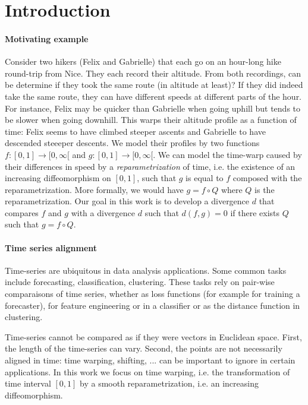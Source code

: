\section{Introduction}
\paragraph{Motivating example} Consider two hikers (Felix and Gabrielle) that each go on an hour-long hike round-trip from Nice. They each record their altitude. From both recordings, can be determine if they took the same route (in altitude at least)? If they did indeed take the same route, they can have different speeds at different parts of the hour. For instance, Felix may be quicker than Gabrielle when going uphill but tends to be slower when going downhill. This warps their altitude profile as a function of time: Felix seems to have climbed steeper ascents and Gabrielle to have descended steeeper descents.
We model their profiles by two functions $f:[0,1] \to [0, \infty[$ and $g:[0, 1] \to [0, \infty[$. We can model the time-warp caused by their differences in speed by a \emph{reparametrization} of time, i.e. the existence of an increasing diffeomorphism on $[0,1]$, such that $g$ is equal to $f$ composed with the reparametrization. More formally, we would have $g = f \circ Q$ where $Q$ is the reparametrization. Our goal in this work is to develop a divergence $d$ that compares $f$ and $g$ with a divergence $d$ such that $d(f, g)=0$ if there exists $Q$ such that $g = f \circ Q$.

\paragraph{Time series alignment}
Time-series are ubiquitous in data analysis applications. Some common tasks include forecasting, classification, clustering. These tasks rely on pair-wise comparaisons of time series, whether as loss functions (for example for training a forecaster), for feature engineering or in a classifier or as the distance function in clustering.

Time-series cannot be compared as if they were vectors in Euclidean space. First, the length of the time-series can vary. Second, the points are not necessarily aligned in time: time warping, shifting, ... can be important to ignore in certain applications. In this work we focus on time warping, i.e. the transformation of time interval $[0,1]$ by a smooth reparametrization, i.e. an increasing diffeomorphism.



